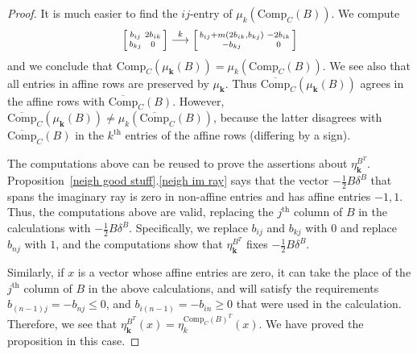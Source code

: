 \documentclass[10pt]{article}
\theoremstyle{definition}
\theoremstyle{remark}
\numberwithin{equation}{section}
\newcommand{\set}[1]{{\lbrace #1 \rbrace}}
\renewcommand{\th}{^\text{th}}
\newcommand{\0}{{\mathbf{0}}}
\newcommand{\Comp}{\mathrm{Comp}_C}
\newcommand{\CompPlus}{\overline{\mathrm{Comp}}_C}
\newcommand{\kk}{{\boldsymbol{k}}}
\renewcommand{\th}{^\text{th}}
\begin{document}
\begin{proof}
It is much easier to find the $ij$-entry of $\mu_k(\Comp(B))$.
We compute
\[
\begin{bsmallmatrix*}
b_{ij}&2b_{ik}\\
b_{kj}&0
\end{bsmallmatrix*}
\overset{k}{\longrightarrow}
\begin{bsmallmatrix*}
b_{ij}+m(2b_{ik},b_{kj})&-2b_{ik}\\
-b_{kj}&0
\end{bsmallmatrix*}
\]
and we conclude that $\Comp(\mu_\kk(B))=\mu_k(\Comp(B))$.
We see also that all entries in affine rows are preserved by $\mu_\kk$.
Thus $\CompPlus(\mu_\kk(B))$ agrees in the affine rows with $\CompPlus(B)$.
However, $\CompPlus(\mu_\kk(B))\neq\mu_k(\CompPlus(B))$, because the latter disagrees with $\CompPlus(B)$ in the $k\th$ entries of the affine rows (differing by a sign).

The computations above can be reused to prove the assertions about $\eta^{B^T}_\kk$.
Proposition~\ref{neigh good stuff}.\ref{neigh im ray} says that the vector $-\frac12B\delta^B$ that spans the imaginary ray is zero in non-affine entries and has affine entries $-1,1$.
Thus, the computations above are valid, replacing the $j\th$ column of $B$ in the calculations with $-\frac12B\delta^B$.
Specifically, we replace $b_{ij}$ and $b_{kj}$ with $0$ and replace $b_{nj}$ with $1$, and the computations show that $\eta^{B^T}_\kk$ fixes $-\frac12B\delta^B$.

Similarly, if $x$ is a vector whose affine entries are zero, it can take the place of the $j\th$ column of $B$ in the above calculations, and will satisfy the requirements $b_{(n-1)j}=-b_{nj}\le0$, and $b_{i(n-1)}=-b_{in}\ge0$ that were used in the calculation.  
Therefore, we see that $\eta^{B^T}_\kk(x)=\eta^{\Comp(B)^T}_k(x)$.
We have proved the proposition in this case.

\medskip


\end{proof}
\end{document}
